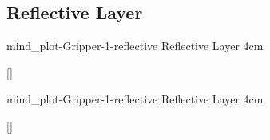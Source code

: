{\newpage
  \noindent\begin{minipage}{\textwidth}
    \subsection{Reflective Layer}
    \experimentcausegroupplots{\dataappendixmaxtime}
                              {\dataappendixexperimentonemaxtime}
                              {\dataappendixexperimenttwomaxtime}
                              {\dataappendixexperimentthreemaxtime}
                              {\dataappendixexperimentonename}
                              {\dataappendixexperimenttwoname}
                              {\dataappendixexperimentthreename}
                              {\dataappendixexperimentoneprettyname}
                              {\dataappendixexperimenttwoprettyname}
                              \experimentcausegroupplotscontinued{\dataappendixexperimentthreeprettyname}
                                                                 {mind_plot-Gripper-1-reflective}
                                                                 {Reflective Layer}
                                                                 {\experimentdatacommontablereference}
                                                                 {4cm}
    \experimentdatablocksworldexample

    []{}
  \label{figure:mind_plot-Gripper-1-reflective}
  \end{minipage}

  \noindent\begin{minipage}{\textwidth}
    \experimentcausegroupplotstwo{\dataappendixmaxtime}
                              {\dataappendixexperimentonemaxtime}
                              {\dataappendixexperimenttwomaxtime}
                              {\dataappendixexperimentthreemaxtime}
                              {\dataappendixexperimentonename}
                              {\dataappendixexperimenttwoname}
                              {\dataappendixexperimentthreename}
                              {\dataappendixexperimentoneprettyname}
                              {\dataappendixexperimenttwoprettyname}
                              \experimentcausegroupplotstwocontinued{\dataappendixexperimentthreeprettyname}
                                                                 {mind_plot-Gripper-1-reflective}
                                                                 {Reflective Layer}
                                                                 {\experimentdatacommontablereference}
                                                                 {4cm}
    \experimentdatablocksworldexample

    []{}
  \label{figure:mind_plot-Gripper-1-reflective}
  \end{minipage}
}
